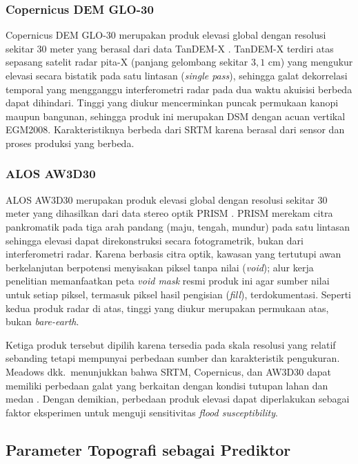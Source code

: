 \documentclass[12pt]{article}
\begin{document}
\subsubsection{Copernicus DEM GLO-30}

Copernicus DEM GLO-30 merupakan produk elevasi global dengan resolusi
sekitar 30 meter yang berasal dari data TanDEM-X \cite{esa_glo30}. TanDEM-X
terdiri atas sepasang satelit radar pita-X (panjang gelombang sekitar
$3{,}1$ cm) yang mengukur elevasi secara bistatik pada satu lintasan
(\textit{single pass}), sehingga galat dekorrelasi temporal yang
mengganggu interferometri radar pada dua waktu akuisisi berbeda
dapat dihindari. Tinggi yang diukur mencerminkan puncak permukaan kanopi
maupun bangunan, sehingga produk ini merupakan DSM dengan acuan vertikal
EGM2008. Karakteristiknya berbeda dari SRTM karena berasal dari sensor dan
proses produksi yang berbeda.

\subsubsection{ALOS AW3D30}

ALOS AW3D30 merupakan produk elevasi global dengan resolusi sekitar 30 meter
yang dihasilkan dari data stereo optik PRISM \cite{tadono2016}. PRISM
merekam citra pankromatik pada tiga arah pandang (maju, tengah, mundur) pada
satu lintasan sehingga elevasi dapat direkonstruksi secara fotogrametrik,
bukan dari interferometri radar. Karena berbasis citra optik, kawasan yang
tertutupi awan berkelanjutan berpotensi menyisakan piksel tanpa nilai
(\textit{void}); alur kerja penelitian memanfaatkan peta \textit{void mask}
resmi produk ini agar sumber nilai untuk setiap piksel, termasuk piksel
hasil pengisian (\textit{fill}), terdokumentasi. Seperti kedua produk radar
di atas, tinggi yang diukur merupakan permukaan atas, bukan
\textit{bare-earth}.

Ketiga produk tersebut dipilih karena tersedia pada skala resolusi yang
relatif sebanding tetapi mempunyai perbedaan sumber dan karakteristik
pengukuran. Meadows dkk.\ menunjukkan bahwa SRTM, Copernicus, dan AW3D30
dapat memiliki perbedaan galat yang berkaitan dengan kondisi tutupan lahan
dan medan \cite{meadows2024}. Dengan demikian, perbedaan produk elevasi dapat
diperlakukan sebagai faktor eksperimen untuk menguji sensitivitas
\textit{flood susceptibility}.

\subsection{Parameter Topografi sebagai Prediktor}
\end{document}
